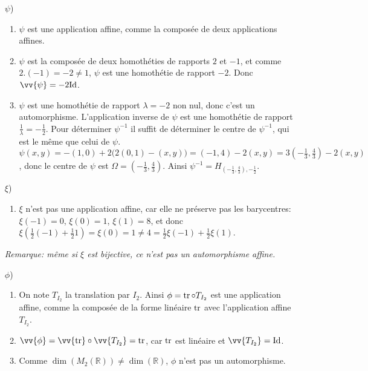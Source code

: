 \documentclass[a4paper,12pt,reqno]{amsart}
\begin{document}
\begin{solution}
  \begin{enumerate}
    \item[$\psi$)]
      \begin{enumerate}[\bf a)]
        \item $\psi$ est une application affine, comme la composée de deux applications affines.
        \item $\psi$ est la composée de deux homothéties de rapports $2$ et $-1$, et comme $2.(-1)=-2\neq 1$, $\psi$ est une homothétie de rapport $-2$. Donc $\vv{\psi}=-2\id$.
        \item $\psi$ est une homothétie de rapport $\lambda=-2$ non nul, donc c'est un automorphisme. L'application inverse de $\psi$ est une homothétie de rapport $\frac{1}{\lambda}=-\frac12$. Pour déterminer $\psi^{-1}$ il suffit de déterminer le centre de $\psi^{-1}$, qui est le même que celui de $\psi$.\newline
        $\psi(x,y)=-(1,0)+2\big(2(0,1)-(x,y)\big)=(-1,4)-2(x,y)=3(-\frac13,\frac43)-2(x,y)$, donc le centre de $\psi$ est $\Omega=(-\frac13,\frac43)$. Ainsi $\psi^{-1}=H_{(-\frac13,\frac43),-\frac12}$.
      \end{enumerate}
    \item[$\xi$)]
      \begin{enumerate}[\bf a)]
        \item $\xi$ n'est pas une application affine, car elle ne préserve pas les barycentres: $\xi(-1)=0$, $\xi(0)=1$, $\xi(1)=8$, et donc $\xi(\frac12(-1)+\frac12 1)=\xi(0)=1 \neq 4=\frac12 \xi(-1) + \frac12 \xi(1)$.
      \end{enumerate}
      \textit{Remarque: même si $\xi$ est bijective, ce n'est pas un automorphisme affine.}
    \item[$\phi$)]
      \begin{enumerate}[\bf a)]
        \item On note $T_{I_{2}}$ la translation par $I_{2}$. Ainsi $\phi=\operatorname{tr}\circ T_{I_{2}}$ est une application affine, comme la composée de la forme linéaire $\operatorname{tr}$ avec l'application affine $T_{I_{2}}$.
        \item $\vv{\phi}=\vv{\tr}\circ\vv{T_{I_{2}}}=\tr$, car $\operatorname{tr}$ est linéaire et $\vv{T_{I_{2}}}=\id$.
        \item Comme $\dim(M_{2}(\mathbb{R})) \neq \dim(\mathbb{R})$, $\phi$ n'est pas un automorphisme.
      \end{enumerate}
  \end{enumerate}
\end{solution}
\end{document}
